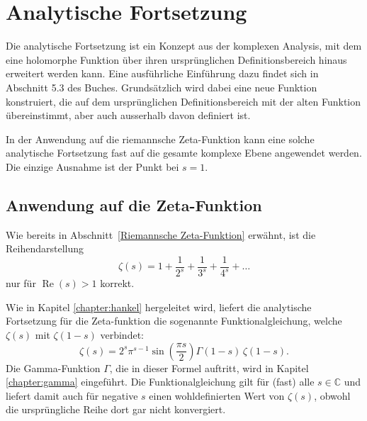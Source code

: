 %
%
%
%
\section{Analytische Fortsetzung
\label{Analytische Fortsetzung}}

Die analytische Fortsetzung ist ein Konzept aus der komplexen Analysis, mit dem eine holomorphe Funktion über ihren ursprünglichen Definitionsbereich hinaus erweitert werden kann.
Eine ausführliche Einführung dazu findet sich in Abschnitt 5.3 des Buches.
Grundsätzlich wird dabei eine neue Funktion konstruiert, die auf dem ursprünglichen Definitionsbereich mit der alten Funktion übereinstimmt, aber auch ausserhalb davon definiert ist.

In der Anwendung auf die riemannsche Zeta-Funktion kann eine solche analytische Fortsetzung fast auf die gesamte komplexe Ebene angewendet werden.
%
Die einzige Ausnahme ist der Punkt bei $s = 1$.

\subsection{Anwendung auf die Zeta-Funktion\label{Anwendung auf die Zeta-Funktion}}

Wie bereits in Abschnitt~\ref{Riemannsche Zeta-Funktion} erwähnt, ist die Reihendarstellung
%
\[
\zeta(s) = 1 + \frac{1}{2^{s}} + \frac{1}{3^{s}} + \frac{1}{4^{s}} + \ldots
\]
nur für $\operatorname{Re}(s) > 1$ korrekt.

Wie in Kapitel \ref{chapter:hankel} hergeleitet wird, liefert die analytische Fortsetzung für die Zeta-funktion die sogenannte Funktionalgleichung, welche $\zeta(s)$ mit $\zeta(1-s)$ verbindet:
%
\[
\zeta(s) = 2^s \pi^{s-1} \sin\left(\frac{\pi s}{2}\right) \Gamma(1 - s)\,\zeta(1 - s).
\]
Die Gamma-Funktion $\Gamma$, die in dieser Formel auftritt, wird in Kapitel \ref{chapter:gamma} eingeführt.
%
Die Funktionalgleichung gilt für (fast) alle $s \in \mathbb{C}$ und liefert damit auch für negative $s$ einen wohldefinierten Wert von $\zeta(s)$, obwohl die ursprüngliche Reihe dort gar nicht konvergiert.

